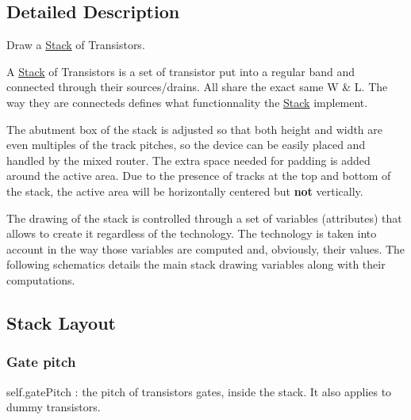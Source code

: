 \subsection{Detailed Description}
Draw a \mbox{\hyperlink{classpython_1_1Stack_1_1Stack}{Stack}} of Transistors. 

A \mbox{\hyperlink{classpython_1_1Stack_1_1Stack}{Stack}} of Transistors is a set of transistor put into a regular band and connected through their sources/drains. All share the exact same W \& L. The way they are connecteds defines what functionnality the \mbox{\hyperlink{classpython_1_1Stack_1_1Stack}{Stack}} implement.

The abutment box of the stack is adjusted so that both height and width are even multiples of the track pitches, so the device can be easily placed and handled by the mixed router. The extra space needed for padding is added around the active area. Due to the presence of tracks at the top and bottom of the stack, the active area will be horizontally centered but {\bfseries not} vertically.

The drawing of the stack is controlled through a set of variables (attributes) that allows to create it regardless of the technology. The technology is taken into account in the way those variables are computed and, obviously, their values. The following schematics details the main stack drawing variables along with their computations.\hypertarget{classpython_1_1Stack_1_1Stack_secStackLayout}{}\subsection{Stack Layout}\label{classpython_1_1Stack_1_1Stack_secStackLayout}
\hypertarget{classpython_1_1Stack_1_1Stack_secGatePitch}{}\subsubsection{Gate pitch}\label{classpython_1_1Stack_1_1Stack_secGatePitch}

\begin{DoxyItemize}
\item {\ttfamily self.\+gate\+Pitch} \+: the pitch of transistors gates, inside the stack. It also applies to dummy transistors.
\end{DoxyItemize}

